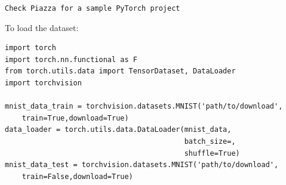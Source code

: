 \documentclass[a4paper]{article}
\theoremstyle{definition}
\begin{document}
{\tt Check Piazza for a sample PyTorch project}


To load the dataset:
\begin{verbatim}
import torch
import torch.nn.functional as F
from torch.utils.data import TensorDataset, DataLoader
import torchvision

mnist_data_train = torchvision.datasets.MNIST('path/to/download',
    train=True,download=True)
data_loader = torch.utils.data.DataLoader(mnist_data,
                                          batch_size=,
                                          shuffle=True)
mnist_data_test = torchvision.datasets.MNIST('path/to/download',
    train=False,download=True)                                          
\end{verbatim}

\end{document}
